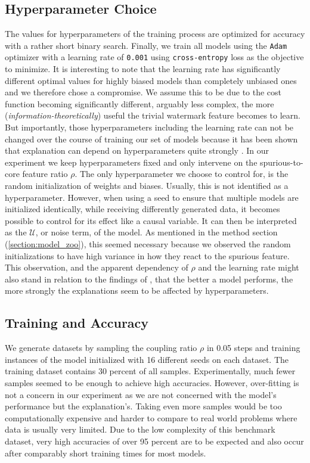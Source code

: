 \subsection{Hyperparameter Choice}
The values for hyperparameters of the training process are optimized for accuracy with a rather short binary search. Finally, we train all models using the \verb|Adam| optimizer with a learning rate of \verb|0.001| using \verb|cross-entropy| loss as the objective to minimize. 
It is interesting to note that the learning rate has significantly different optimal values for highly biased models than completely unbiased ones and we therefore chose a compromise. We assume this to be due to the cost function becoming significantly different, arguably less complex, the more (\textit{information-theoretically}) useful the trivial watermark feature becomes to learn.
But importantly, those hyperparameters including the learning rate can not be changed over the course of training our set of models because it has been shown that explanation can depend on hyperparameters quite strongly \citep{Karimi2023}.
In our experiment we keep hyperparameters fixed and only intervene on the spurious-to-core feature ratio $\rho$. The only hyperparameter we choose to control for, is the random initialization of weights and biases. Usually, this is not identified as a hyperparameter. However, when using a seed to ensure that multiple models are initialized identically, while receiving differently generated data, it becomes possible to control for its effect like a causal variable. It can then be interpreted as the $\mathcal{U}$, or noise term, of the model.
As mentioned in the method section (\ref{section:model_zoo}), this seemed necessary because we observed the random initializations to have high variance in how they react to the spurious feature. This observation, and the apparent dependency of $\rho$ and the learning rate might also stand in relation to the findings of \cite{Karimi2023}, that the better a model performs, the more strongly the explanations seem to be affected by hyperparameters.

\subsection{Training and Accuracy}
We generate datasets by sampling the coupling ratio $\rho$ in 0.05 steps and training  instances of the model initialized with 16 different seeds on each dataset. The training dataset contains 30 percent of all samples. Experimentally, much fewer samples seemed to be enough to achieve high accuracies. However, over-fitting is not a concern in our experiment as we are not concerned with the model's performance but the explanation's. Taking even more samples would be too computationally expensive and harder to compare to real world problems where data is usually very limited. 
Due to the low complexity of this benchmark dataset, very high accuracies of over 95 percent are to be expected and also occur after comparably short training times for most models. \\


